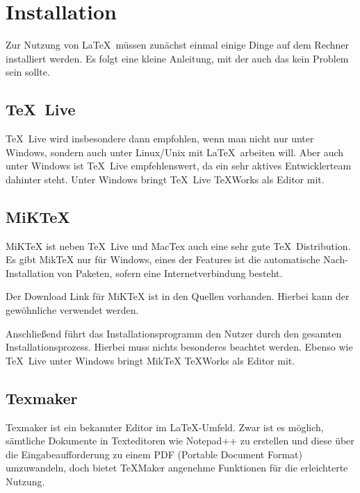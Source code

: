 
\chapter{Installation}\label{ch:installation}

Zur Nutzung von \LaTeX\ müssen zunächst einmal einige Dinge auf dem Rechner installiert werden. 
Es folgt eine kleine Anleitung, mit der auch das kein Problem sein sollte.

\section{\TeX\ Live}

\TeX\ Live wird insbesondere dann empfohlen, wenn man nicht nur unter Windows, sondern auch unter Linux/Unix mit \LaTeX\ arbeiten will. Aber auch unter Windows ist \TeX\ Live empfehlenswert, da ein sehr aktives Entwicklerteam dahinter steht. Unter Windows bringt \TeX\ Live \TeX Works als Editor mit.

\section{MiKTeX}

MiKTeX ist neben \TeX\ Live und MacTex auch eine sehr gute \TeX\ Distribution. Es gibt MikTeX nur für Windows, eines der Features ist die automatische Nach-Installation von Paketen, sofern eine Internetverbindung besteht.

Der Download Link für MiKTeX ist in den Quellen vorhanden.\autocite[Vgl.][]{miktex} Hierbei kann der gewöhnliche  verwendet werden. 

Anschließend führt das Installationsprogramm den Nutzer durch den gesamten Installationsprozess. Hierbei muss nichts besonderes beachtet werden. Ebenso wie \TeX\ Live unter Windows bringt MikTeX \TeX Works als Editor mit.

\section{Texmaker}

Texmaker ist ein bekannter Editor im \LaTeX-Umfeld. 
Zwar ist es möglich, sämtliche Dokumente in Texteditoren wie Notepad++ zu erstellen und diese über die Eingabeaufforderung zu einem PDF (Portable Document Format) umzuwandeln, doch bietet TeXMaker angenehme Funktionen für die erleichterte Nutzung.

